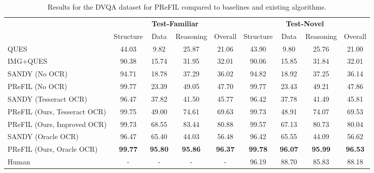 \documentclass[10pt,twocolumn]{article}
\begin{document}
\begin{table*}
\centering
\footnotesize
\caption{Results for the DVQA dataset for PReFIL compared to baselines and existing algorithms.}
\vspace{3pt}
\label{tab:results-dvqa}
\begin{tabular}{@{}lcccccccc@{}}
\toprule
            & \multicolumn{4}{c}{\textbf{Test-Familiar}} & \multicolumn{4}{c}{\textbf{Test-Novel}} \\ 
            \cmidrule(r){2-5} \cmidrule(l){6-9}
            & Structure  & Data   & Reasoning  & Overall & Structure  & Data  & Reasoning & Overall \\ \midrule
QUES \cite{kafle2018dvqa}        & 44.03      & 9.82   & 25.87      & 21.06   & 43.90      & 9.80  & 25.76     & 21.00   \\
IMG+QUES \cite{kafle2018dvqa}    & 90.38      & 15.74  & 31.95      & 32.01   & 90.06      & 15.85 & 31.84     & 32.01   \\ 

\midrule
SANDY (No OCR) \cite{kafle2018dvqa}  & 94.71      & 18.78  & 37.29      & 36.02   & 94.82 &18.92& 37.25& 36.14 \\
PReFIL (No OCR) & 99.77           & 23.39       &  49.05   & 47.70 &    99.77     &     23.43       &  49.21     & 47.86   \\

\midrule
SANDY (Tesseract OCR) \cite{kafle2018dvqa}  & 96.47      & 37.82  & 41.50      & 45.77   & 96.42      & 37.78 & 41.49     & 45.81  \\ 
PReFIL (Ours, Tesseract OCR) & 99.75           & 49.00       &  74.61   & 69.63 &    99.73     &     48.91       &  74.07     & 69.53         \\
PReFIL (Ours, Improved OCR) & 99.73           & 68.55       &  83.44 & 80.88 &    99.57     &     67.13       &  80.73     & 80.04         \\

\midrule
SANDY (Oracle OCR) \cite{kafle2018dvqa}  & 96.47      & 65.40  & 44.03      & 56.48   & 96.42      & 65.55 & 44.09     & 56.62   \\
PReFIL (Ours, Oracle OCR) & \textbf{99.77}      & \textbf{95.80}  & \textbf{95.86}    & \textbf{96.37}   & \textbf{99.78}      & \textbf{96.07} & \textbf{95.99}     & \textbf{96.53}   \\ \midrule
Human  & -      & -  & -      & -   & 96.19      & 88.70 & 85.83     & 88.18   \\ \bottomrule
\end{tabular}

\end{table*}
\end{document}
